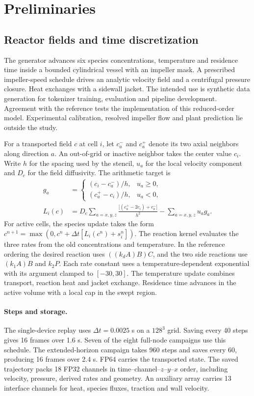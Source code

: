 \documentclass{article}
\begin{document}
\section{Preliminaries}
\subsection{Reactor fields and time discretization}
The generator advances six species concentrations, temperature and residence time inside a bounded cylindrical vessel with an impeller mask. A prescribed impeller-speed schedule drives an analytic velocity field and a centrifugal pressure closure. Heat exchanges with a sidewall jacket. The intended use is synthetic data generation for tokenizer training, evaluation and pipeline development. Agreement with the reference tests the implementation of this reduced-order model. Experimental calibration, resolved impeller flow and plant prediction lie outside the study.

For a transported field $c$ at cell $i$, let $c_a^-$ and $c_a^+$ denote its two axial neighbors along direction $a$. An out-of-grid or inactive neighbor takes the center value $c_i$. Write $h$ for the spacing used by the stencil, $u_a$ for the local velocity component and $D_c$ for the field diffusivity. The arithmetic target is
\begin{align}
 g_a &=
 \begin{cases}
 (c_i-c_a^-)/h,&u_a\geq0,\\
 (c_a^+-c_i)/h,&u_a<0,
 \end{cases} \\
 L_i(c)&=D_c\sum_{a=x,y,z}\frac{\bigl[(c_a^+-2c_i)+c_a^-\bigr]}{h^2}
             -\sum_{a=x,y,z}u_a g_a . \label{eq:transport}
\end{align}
For active cells, the species update takes the form
$c^{n+1}=\max(0,c^n+\Delta t[L_i(c^n)+s_i^n])$.
The reaction kernel evaluates the three rates from the old concentrations and temperature. In the reference ordering the desired reaction uses $((k_d A)B)C$, and the two side reactions use $(k_1 A)B$ and $k_2 P$. Each rate constant uses a temperature-dependent exponential with its argument clamped to $[-30,30]$. The temperature update combines transport, reaction heat and jacket exchange. Residence time advances in the active volume with a local cap in the swept region.

\paragraph{Steps and storage.}
The single-device replay uses $\Delta t=0.0025$ s on a $128^3$ grid. Saving every 40 steps gives 16 frames over 1.6 s. Seven of the eight full-node campaigns use this schedule. The extended-horizon campaign takes 960 steps and saves every 60, producing 16 frames over 2.4 s. FP64 carries the transported state. The saved trajectory packs 18 FP32 channels in time--channel--$z$--$y$--$x$ order, including velocity, pressure, derived rates and geometry. An auxiliary array carries 13 interface channels for heat, species fluxes, traction and wall velocity.
\end{document}

